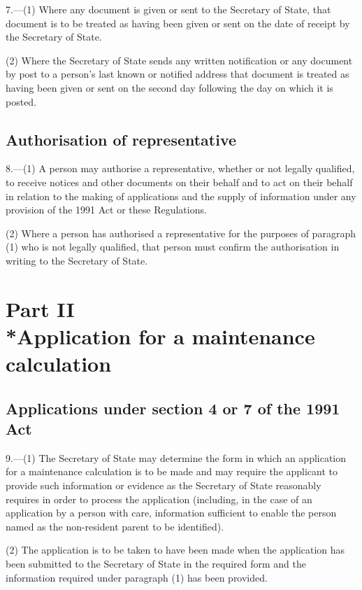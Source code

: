 \documentclass[12pt,a4paper]{article}
\begin{document}
7.---(1)  Where any document is given or sent to the Secretary of State, that document is to be treated as having been given or sent on the date of receipt by the Secretary of State.

(2) Where the Secretary of State sends any written notification or any document by post to a person’s last known or notified address that document is treated as having been given or sent on the second day following the day on which it is posted.

\subsection[8. Authorisation of representative]{Authorisation of representative}

8.---(1)  A person may authorise a representative, whether or not legally qualified, to receive notices and other documents on their behalf and to act on their behalf in relation to the making of applications and the supply of information under any provision of the 1991 Act or these Regulations.

(2) Where a person has authorised a representative for the purposes of paragraph (1) who is not legally qualified, that person must confirm the authorisation in writing to the Secretary of State.

\section[Part II --- Application for a maintenance calculation]{Part II\\*Application for a maintenance calculation}

\renewcommand\parthead{--- Part II}

\subsection[9. Applications under section 4 or 7 of the 1991 Act]{Applications under section 4 or 7 of the 1991 Act}

9.---(1)  The Secretary of State may determine the form in which an application for a maintenance calculation is to be made and may require the applicant to provide such information or evidence as the Secretary of State reasonably requires in order to process the application (including, in the case of an application by a person with care, information sufficient to enable the person named as the non-resident parent to be identified).

(2) The application is to be taken to have been made when the application has been submitted to the Secretary of State in the required form and the information required under paragraph (1) has been provided.
\end{document}
